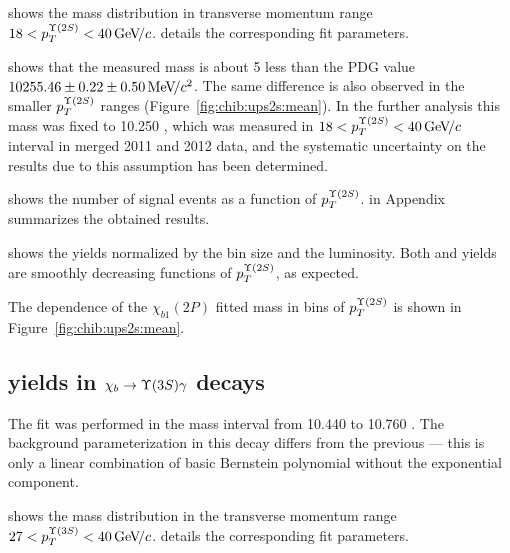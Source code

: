  shows the mass distribution in transverse
momentum range $18 < p_T^{\TwoS} < 40 \gevc$. 
details the corresponding fit parameters.




 shows that the measured \chiboneTwoP mass is
about 5 \mevcc less than the PDG value $10255.46  \pm 0.22 \pm 0.50 {\mathrm{\,Me\kern -0.1em V\!/}c^2}$.
The same difference is also observed in the smaller $p_T^{\Y2S}$ ranges
(Figure~\ref{fig:chib:ups2s:mean}).
In the further analysis this mass was fixed to 10.250 \gevcc, which was measured
in $18 < p_T^{\Y2S} < 40 \gevc$ interval in merged 2011 and 2012 data, and the
systematic uncertainty on the results due to this assumption has been
determined.



 shows the number of signal events as a function
of $p_T^{\Y2S}$.  in Appendix summarizes the
obtained results.



 shows the yields normalized by the bin
size and the luminosity. Both \chibTwoP and \chibThreeP yields are smoothly
decreasing functions of $p_T^{\Y2S}$, as expected.

The dependence of the $\chi_{b1}(2P)$ fitted mass in bins of $p_T^{\Y2S}$ is
shown in Figure~\ref{fig:chib:ups2s:mean}.


\subsection{\texorpdfstring{\chib}{xb} yields in
	\texorpdfstring{$\chib \to \Y3S \gamma$}{xb --> Y(3S) gamma} decays}
\label{sec:chib:ups3s:fit}

The fit was performed in the mass interval from  10.440 to 10.760 \gevcc. 
The background parameterization in this decay differs from the previous ---
this is only a linear combination of basic Bernstein polynomial without the
exponential component.

 shows the mass distribution in the
transverse momentum range $27<p_T^{\Y3S}<40\gevc$.
 details the corresponding fit parameters.




